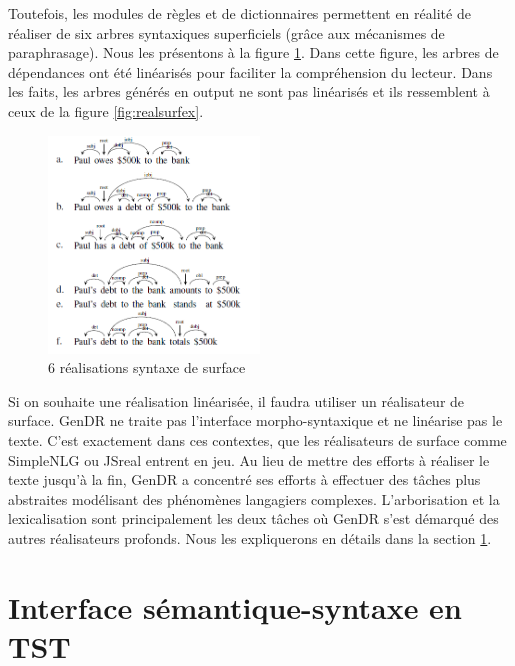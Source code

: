 Toutefois, les modules de règles et de dictionnaires permettent en réalité de réaliser de six arbres syntaxiques superficiels (grâce aux mécanismes de paraphrasage). Nous les présentons à la figure \ref{fig:6realsurf}. Dans cette figure, les arbres de dépendances ont été linéarisés pour faciliter la compréhension du lecteur. Dans les faits, les arbres générés en output ne sont pas linéarisés et ils ressemblent à ceux de la figure \ref{fig:realsurfex}.

\begin{figure}[htb]
	\centering
	\includegraphics[width=0.5\textwidth, trim = {0cm 0cm 0cm 0cm},clip]{ch3/figs/exemples_real.png}
	\caption{6 réalisations syntaxe de surface}
	\label{fig:6realsurf}
\end{figure}

Si on souhaite une réalisation linéarisée,  il faudra utiliser un réalisateur de surface. GenDR ne traite pas l'interface morpho-syntaxique et ne linéarise pas le texte. C'est exactement dans ces contextes, que les réalisateurs de surface comme SimpleNLG ou JSreal \cite{DaoustJSREALTextRealizer2015}\cite{MolinsJSrealBBilingualText2015}\cite{GattSimpleNLGRealisationEngine2009}entrent en jeu. Au lieu de mettre des efforts à réaliser le texte jusqu'à la fin, GenDR a concentré ses efforts à effectuer des tâches plus abstraites modélisant des phénomènes langagiers complexes. L'arborisation et la lexicalisation sont principalement les deux tâches où GenDR s'est démarqué des autres réalisateurs profonds. Nous les expliquerons en détails dans la section \ref{secsemsynt}.


\section{Interface sémantique-syntaxe en TST}\label{secsemsynt}

